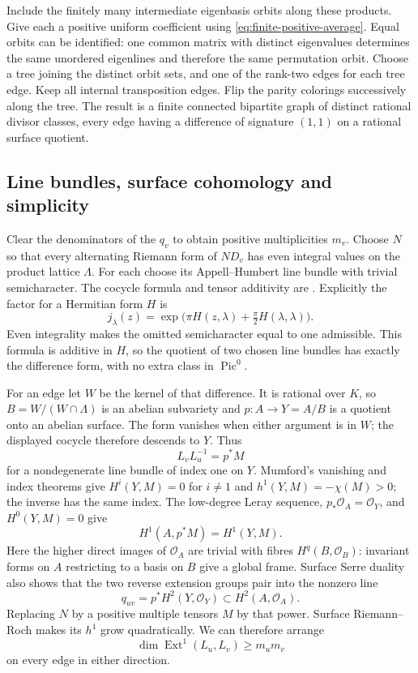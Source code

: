\documentclass[11pt]{article}
\theoremstyle{definition}
\theoremstyle{remark}
\begin{document}
Include the finitely many intermediate eigenbasis orbits along
these products.  Give each a positive uniform coefficient using
\eqref{eq:finite-positive-average}.  Equal orbits can be identified:
one common matrix with distinct eigenvalues determines the same
unordered eigenlines and therefore the same permutation orbit.
Choose a tree joining the distinct orbit sets, and one of the
rank-two edges for each tree edge.  Keep all internal transposition
edges.  Flip the parity colorings successively along the tree.
The result is a finite connected bipartite graph of distinct rational
divisor classes, every edge having a difference of signature $(1,1)$
on a rational surface quotient.

\subsection{Line bundles, surface cohomology and simplicity}

Clear the denominators of the $q_v$ to obtain positive multiplicities
$m_v$.  Choose $N$ so that every alternating Riemann form of $ND_v$
has even integral values on the product lattice $\Lambda$.
For each choose its Appell--Humbert line bundle with trivial
semicharacter.  The cocycle formula and tensor additivity are
\cite[\S2, pp.~20--21]{MumfordAV}.
Explicitly the factor for a Hermitian form $H$ is
\[
 j_\lambda(z)=
 \exp\bigl(\pi H(z,\lambda)+\tfrac\pi2H(\lambda,\lambda)\bigr).
\]
Even integrality makes the omitted semicharacter equal to one
admissible.  This formula is additive in $H$, so the quotient of
two chosen line bundles has exactly the difference form, with
no extra class in $\operatorname{Pic}^0$.

For an edge let $W$ be the kernel of that difference.  It is rational
over $K$, so $B=W/(W\cap\Lambda)$ is an abelian subvariety and
$p:A\to Y=A/B$ is a quotient onto an abelian surface.
The form vanishes when either argument is in $W$; the displayed
cocycle therefore descends to $Y$.  Thus
\[
 L_vL_u^{-1}=p^*M
\]
for a nondegenerate line bundle of index one on $Y$.
Mumford's vanishing and index theorems
\cite[\S16, pp.~150,155,162]{MumfordAV} give
$H^i(Y,M)=0$ for $i\ne1$ and $h^1(Y,M)=-\chi(M)>0$;
the inverse has the same index.
The low-degree Leray sequence, $p_*\mathcal O_A=\mathcal O_Y$,
and $H^0(Y,M)=0$ give
\[
 H^1(A,p^*M)=H^1(Y,M).
\]
Here the higher direct images of $\mathcal O_A$ are trivial with
fibres $H^q(B,\mathcal O_B)$: invariant forms on $A$ restricting to
a basis on $B$ give a global frame.
Surface Serre duality also shows that the two reverse extension
groups pair into the nonzero line
\begin{equation}
 q_{uv}=p^*H^2(Y,\mathcal O_Y)\subset H^2(A,\mathcal O_A).
 \label{eq:edge-surface-line}
\end{equation}
Replacing $N$ by a positive multiple tensors $M$ by that power.
Surface Riemann--Roch makes its $h^1$ grow quadratically.
We can therefore arrange
\[
 \dim\operatorname{Ext}^1(L_u,L_v)\ge m_um_v
\]
on every edge in either direction.
\end{document}
